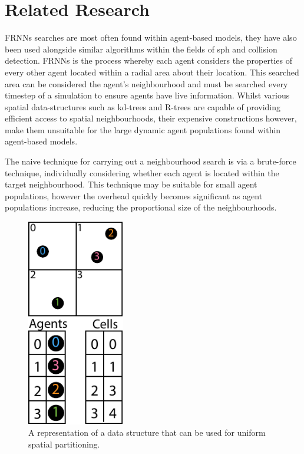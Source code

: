 \section{Related Research\label{sec:related-work}}
  FRNNs searches are most often found within agent-based models, they have also been used alongside similar algorithms within the fields of \gls{sph} and collision detection. FRNNs is the process whereby each agent considers the properties of every other agent located within a radial area about their location. This searched area can be considered the agent’s neighbourhood and must be searched every timestep of a simulation to ensure agents have live information. Whilst various spatial data-structures such as kd-trees and R-trees are capable of providing efficient access to spatial neighbourhoods, their expensive constructions however, make them unsuitable for the large dynamic agent populations found within agent-based models.

  The naive technique for carrying out a neighbourhood search is via a brute-force technique, individually considering whether each agent is located within the target neighbourhood. This technique may be suitable for small agent populations, however the overhead quickly becomes significant as agent populations increase, reducing the proportional size of the neighbourhoods.
\begin{figure}
  \begin{center}
    \includegraphics[width=0.38\textwidth]{../resources/usp/usp.pdf}
  \end{center}
  \caption{\label{fig:usp} A representation of a data structure that can be used for uniform spatial partitioning.}
\end{figure}
  
